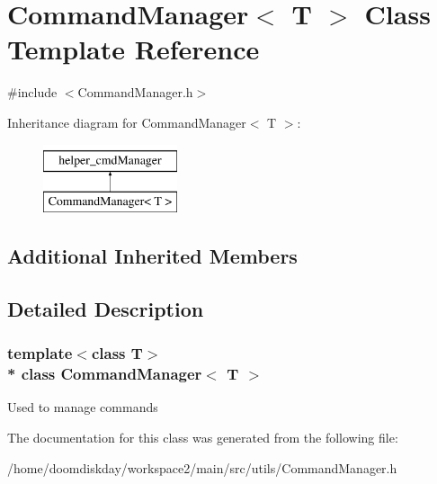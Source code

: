 \hypertarget{classCommandManager}{}\section{Command\+Manager$<$ T $>$ Class Template Reference}
\label{classCommandManager}


{\ttfamily \#include $<$Command\+Manager.\+h$>$}

Inheritance diagram for Command\+Manager$<$ T $>$\+:\begin{figure}[H]
\begin{center}
\leavevmode
\includegraphics[height=2.000000cm]{classCommandManager}
\end{center}
\end{figure}
\subsection*{Additional Inherited Members}


\subsection{Detailed Description}
\subsubsection*{template$<$class T$>$\\*
class Command\+Manager$<$ T $>$}

Used to manage commands 

The documentation for this class was generated from the following file\+:\begin{DoxyCompactItemize}
\item 
/home/doomdiskday/workspace2/main/src/utils/Command\+Manager.\+h\end{DoxyCompactItemize}
